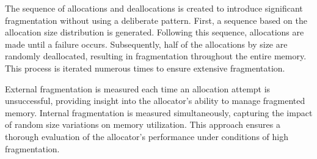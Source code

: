 The sequence of allocations and deallocations is created to introduce significant fragmentation without using a deliberate pattern. First, a sequence based on the allocation size distribution is generated. Following this sequence, allocations are made until a failure occurs. Subsequently, half of the allocations by size are randomly deallocated, resulting in fragmentation throughout the entire memory. This process is iterated numerous times to ensure extensive fragmentation.

External fragmentation is measured each time an allocation attempt is unsuccessful, providing insight into the allocator’s ability to manage fragmented memory. Internal fragmentation is measured simultaneously, capturing the impact of random size variations on memory utilization. This approach ensures a thorough evaluation of the allocator's performance under conditions of high fragmentation.

